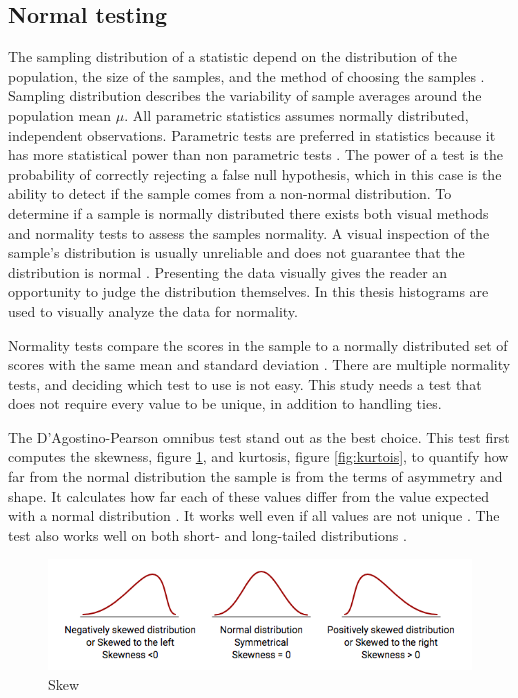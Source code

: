 \subsection{Normal testing}\label{sec:normaltesting}
The sampling distribution of a statistic depend on the distribution of the population, the size of the samples, and the method of choosing the samples \citep{Walpole2012}. Sampling distribution describes the variability of sample averages around the population mean $\mu$. All parametric statistics assumes normally distributed, independent observations. Parametric tests are preferred in statistics because it has more statistical power than non parametric tests \citep{Frost2015}. The power of a test is the probability of correctly rejecting a false null hypothesis, which in this case is the ability to detect if the sample comes from a non-normal distribution. To determine if a sample is normally distributed there exists both visual methods and normality tests to assess the samples normality. A visual inspection of the sample's distribution is usually unreliable and does not guarantee that the distribution is normal \citep{Pearson2006}. Presenting the data visually gives the reader an opportunity to judge the distribution themselves. In this thesis histograms are used to visually analyze the data for normality. 

Normality tests compare the scores in the sample to a normally distributed set of scores with the same mean and standard deviation \citep{Ghasemi2012}. There are multiple normality tests, and deciding which test to use is not easy. This study needs a test that does not require every value to be unique, in addition to handling ties.

The D'Agostino-Pearson omnibus test stand out as the best choice. This test first computes the skewness, figure \ref{fig:skew}, and kurtosis, figure \ref{fig:kurtois}, to quantify how far from the normal distribution the sample is from the terms of asymmetry and shape. It calculates how far each of these values differ from the value expected with a normal distribution \citep{Pearson2006}. It works well even if all values are not unique \citep{Motulsky2013}. The test also works well on both short- and long-tailed distributions \citep{Yap2011}. \newline  %

\begin{figure}[h!]
	\centering
	\includegraphics[width=0.7\linewidth]{"fig/skew"}
	\caption{Skew \citep{MedCalcSoftwarebvba2017}}
	\label{fig:skew}
\end{figure}

